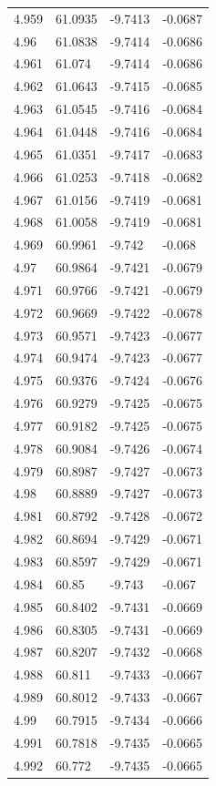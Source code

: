 \begin{tabular}{llll}
4.959 & 61.0935 & -9.7413 & -0.0687 \\
4.96 & 61.0838 & -9.7414 & -0.0686 \\
4.961 & 61.074 & -9.7414 & -0.0686 \\
4.962 & 61.0643 & -9.7415 & -0.0685 \\
4.963 & 61.0545 & -9.7416 & -0.0684 \\
4.964 & 61.0448 & -9.7416 & -0.0684 \\
4.965 & 61.0351 & -9.7417 & -0.0683 \\
4.966 & 61.0253 & -9.7418 & -0.0682 \\
4.967 & 61.0156 & -9.7419 & -0.0681 \\
4.968 & 61.0058 & -9.7419 & -0.0681 \\
4.969 & 60.9961 & -9.742 & -0.068 \\
4.97 & 60.9864 & -9.7421 & -0.0679 \\
4.971 & 60.9766 & -9.7421 & -0.0679 \\
4.972 & 60.9669 & -9.7422 & -0.0678 \\
4.973 & 60.9571 & -9.7423 & -0.0677 \\
4.974 & 60.9474 & -9.7423 & -0.0677 \\
4.975 & 60.9376 & -9.7424 & -0.0676 \\
4.976 & 60.9279 & -9.7425 & -0.0675 \\
4.977 & 60.9182 & -9.7425 & -0.0675 \\
4.978 & 60.9084 & -9.7426 & -0.0674 \\
4.979 & 60.8987 & -9.7427 & -0.0673 \\
4.98 & 60.8889 & -9.7427 & -0.0673 \\
4.981 & 60.8792 & -9.7428 & -0.0672 \\
4.982 & 60.8694 & -9.7429 & -0.0671 \\
4.983 & 60.8597 & -9.7429 & -0.0671 \\
4.984 & 60.85 & -9.743 & -0.067 \\
4.985 & 60.8402 & -9.7431 & -0.0669 \\
4.986 & 60.8305 & -9.7431 & -0.0669 \\
4.987 & 60.8207 & -9.7432 & -0.0668 \\
4.988 & 60.811 & -9.7433 & -0.0667 \\
4.989 & 60.8012 & -9.7433 & -0.0667 \\
4.99 & 60.7915 & -9.7434 & -0.0666 \\
4.991 & 60.7818 & -9.7435 & -0.0665 \\
4.992 & 60.772 & -9.7435 & -0.0665 \\

\end{tabular}
